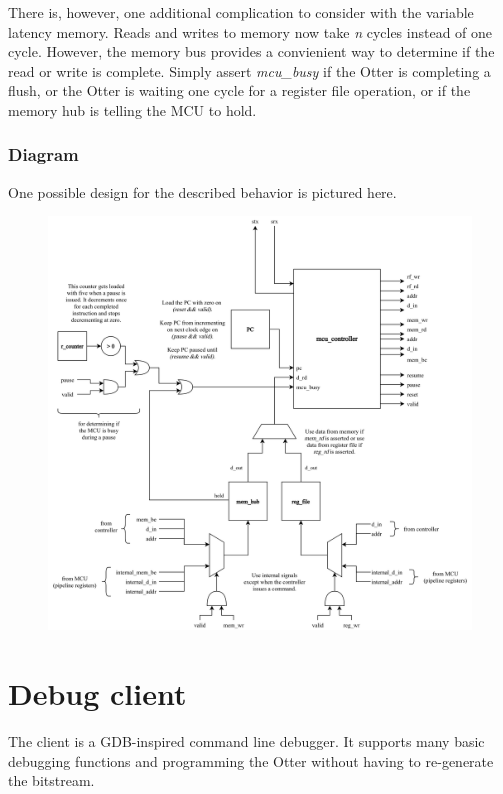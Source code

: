 \documentclass[10pt,a4paper]{article}
\begin{document}
There is, however, one additional complication to consider with the variable latency memory. Reads
and writes to memory now take \emph{n} cycles instead of one cycle. However, the memory bus provides
a convienient way to determine if the read or write is complete. Simply assert \emph{mcu\_busy} if
the Otter is completing a flush, or the Otter is waiting one cycle for a register file operation, or
if the memory hub is telling the MCU to hold.

\newpage
\subsubsection{Diagram}
One possible design for the described behavior is pictured here.

\begin{center}
\begin{figure}[htpb]
    \centering
    \includegraphics[width=\linewidth]{pipeline.png}
\end{figure}
\end{center}

\newpage
\section{Debug client}
The client is a GDB-inspired command line debugger. It supports many basic debugging functions and
programming the Otter without having to re-generate the bitstream.
\end{document}
